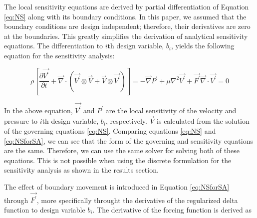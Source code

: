 \documentclass{aiaa-pretty}
\begin{document}
The local sensitivity equations are derived by partial differentiation of Equation \eqref{eq:NS} along with its boundary conditions. In this paper, we assumed that the boundary conditions are design independent; therefore, their derivatives are zero at the boundaries. This greatly simplifies the derivation of analytical sensitivity equations. The differentiation to $i$th design variable, $b_i$, yields the following equation for the sensitivity analysis:

%
\begin{subequations}\label{eq:NSforSA}
\begin{equation}
	\rho \left[
	\frac{\partial \vec{V^\prime}}{\partial t} + 
	\vec{\nabla} \cdot \left( \vec{V^\prime} \otimes \vec{V} + \vec{V} \otimes \vec{V^\prime} \right) 
	\right] = 
	-\vec{\nabla} P^\prime + \mu \nabla^2 \vec{V^\prime} + \vec{F^\prime}
\end{equation}
\begin{equation}
	\vec{\nabla} \cdot \vec{V^\prime} = 0
\end{equation}
\end{subequations}
%

In the above equation, $\vec{V^\prime}$ and $P^\prime$ are the local sensitivity of the velocity and pressure to $i$th design variable, $b_i$, respectively. $\vec{V}$ is calculated from the solution of the governing equations \eqref{eq:NS}. Comparing equations \eqref{eq:NS} and \eqref{eq:NSforSA}, we can see that the form of the governing and sensitivity equations are the same. Therefore, we can use the same solver for solving both of these equations. This is not possible when using the discrete formulation for the sensitivity analysis as shown in the results section.

The effect of boundary movement is introduced in Equation \eqref{eq:NSforSA} through $\vec{F^\prime}$, more specifically throught the derivative of the regularized delta function to design variable $b_i$. The derivative of the forcing function is derived as
\end{document}
